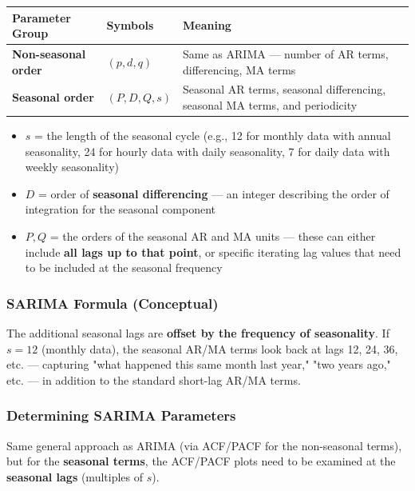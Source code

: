 \documentclass[12pt,openany]{book}
\begin{document}
\begin{center}
\begin{tabular}{|L{0.22\textwidth}|L{0.32\textwidth}|L{0.32\textwidth}|}
\hline
Parameter Group & Symbols & Meaning \\
\hline
\textbf{Non-seasonal order} & \((p, d, q)\) & Same as ARIMA --- number of AR terms, differencing, MA terms \\
\hline
\textbf{Seasonal order} & \((P, D, Q, s)\) & Seasonal AR terms, seasonal differencing, seasonal MA terms, and periodicity \\
\hline
\end{tabular}
\end{center}

\begin{itemize}[leftmargin=*]
    \item \textbf{\(s\)} = the length of the seasonal cycle (e.g., 12 for monthly data with annual seasonality, 24 for hourly data with daily seasonality, 7 for daily data with weekly seasonality)
    \item \textbf{\(D\)} = order of \textbf{seasonal differencing} --- an integer describing the order of integration for the seasonal component
    \item \textbf{\(P, Q\)} = the orders of the seasonal AR and MA units --- these can either include \textbf{all lags up to that point}, or specific iterating lag values that need to be included at the seasonal frequency
\end{itemize}

\subsubsection{SARIMA Formula (Conceptual)}

The additional seasonal lags are \textbf{offset by the frequency of seasonality}. If \(s = 12\) (monthly data), the seasonal AR/MA terms look back at lags 12, 24, 36, etc. --- capturing "what happened this same month last year," "two years ago," etc. --- in addition to the standard short-lag AR/MA terms.

\subsubsection{Determining SARIMA Parameters}

Same general approach as ARIMA (via ACF/PACF for the non-seasonal terms), but for the \textbf{seasonal terms}, the ACF/PACF plots need to be examined at the \textbf{seasonal lags} (multiples of \(s\)).
\end{document}
